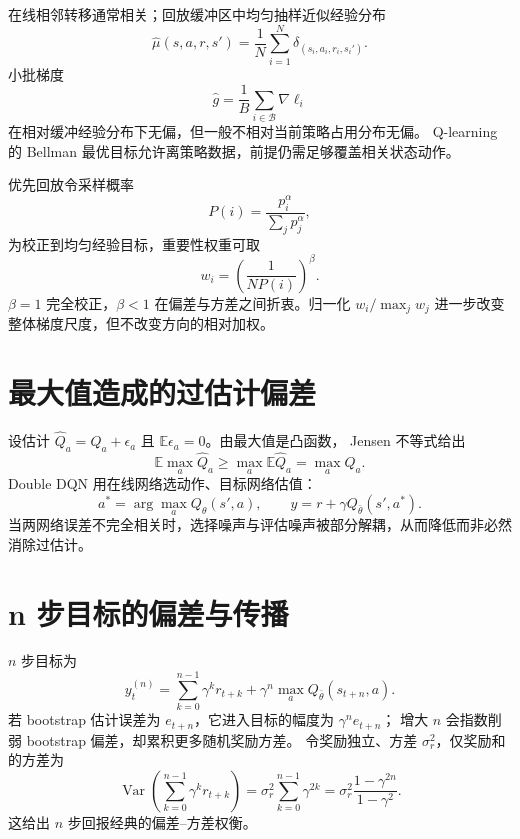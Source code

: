 \documentclass[11pt]{article}
\numberwithin{equation}{section}
\newcommand{\E}{\mathbb{E}}
\newcommand{\1}{\mathbf{1}}
\newcommand{\Var}{\operatorname{Var}}
\begin{document}
在线相邻转移通常相关；回放缓冲区中均匀抽样近似经验分布
\begin{equation}
 \widehat\mu(s,a,r,s')=\frac1N\sum_{i=1}^{N}
 \delta_{(s_i,a_i,r_i,s_i')}.
\end{equation}
小批梯度
\begin{equation}
 \widehat g=\frac1B\sum_{i\in\mathcal B}\nabla\ell_i
\end{equation}
在相对缓冲经验分布下无偏，但一般不相对当前策略占用分布无偏。
Q-learning 的 Bellman 最优目标允许离策略数据，前提仍需足够覆盖相关状态动作。

优先回放令采样概率
\begin{equation}
 P(i)=\frac{p_i^\alpha}{\sum_jp_j^\alpha},
\end{equation}
为校正到均匀经验目标，重要性权重可取
\begin{equation}
 w_i=\left(\frac1{NP(i)}\right)^\beta.
\end{equation}
$\beta=1$ 完全校正，$\beta<1$ 在偏差与方差之间折衷。归一化
$w_i/\max_jw_j$ 进一步改变整体梯度尺度，但不改变方向的相对加权。

\section{最大值造成的过估计偏差}

设估计 $\widehat Q_a=Q_a+\epsilon_a$ 且 $\E\epsilon_a=0$。由最大值是凸函数，
Jensen 不等式给出
\begin{equation}
 \E\max_a\widehat Q_a
 \ge\max_a\E\widehat Q_a
 =\max_aQ_a.
\end{equation}
Double DQN 用在线网络选动作、目标网络估值：
\begin{equation}
 a^*=\arg\max_a Q_\theta(s',a),
 \qquad y=r+\gamma Q_{\bar\theta}(s',a^*).
\end{equation}
当两网络误差不完全相关时，选择噪声与评估噪声被部分解耦，从而降低而非必然消除过估计。

\section{n 步目标的偏差与传播}

$n$ 步目标为
\begin{equation}
 y_t^{(n)}=\sum_{k=0}^{n-1}\gamma^kr_{t+k}
 +\gamma^n\max_aQ_{\bar\theta}(s_{t+n},a).
\end{equation}
若 bootstrap 估计误差为 $e_{t+n}$，它进入目标的幅度为 $\gamma^ne_{t+n}$；
增大 $n$ 会指数削弱 bootstrap 偏差，却累积更多随机奖励方差。
令奖励独立、方差 $\sigma_r^2$，仅奖励和的方差为
\begin{equation}
 \Var\left(\sum_{k=0}^{n-1}\gamma^kr_{t+k}\right)
 =\sigma_r^2\sum_{k=0}^{n-1}\gamma^{2k}
 =\sigma_r^2\frac{1-\gamma^{2n}}{1-\gamma^2}.
\end{equation}
这给出 $n$ 步回报经典的偏差--方差权衡。
\end{document}
